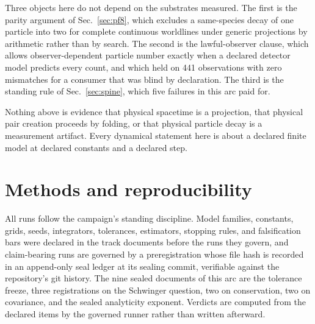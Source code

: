 \documentclass[aps,pre,reprint,nofootinbib,floatfix]{revtex4-2}
\begin{document}
Three objects here do not depend on the substrates measured.  The first
is the parity argument of Sec.~\ref{sec:pf8}, which excludes a
same-species decay of one particle into two for complete continuous
worldlines under generic projections by arithmetic rather than by
search.  The second is the lawful-observer clause, which allows
observer-dependent particle number exactly when a declared detector
model predicts every count, and which held on 441 observations with
zero mismatches for a consumer that was blind by declaration.  The
third is the standing rule of Sec.~\ref{sec:spine}, which five failures
in this arc paid for.

Nothing above is evidence that physical spacetime is a projection, that
physical pair creation proceeds by folding, or that physical particle
decay is a measurement artifact.  Every dynamical statement here is
about a declared finite model at declared constants and a declared
step.

\section{Methods and reproducibility}
\label{sec:methods}

All runs follow the campaign's standing discipline.  Model families,
constants, grids, seeds, integrators, tolerances, estimators, stopping
rules, and falsification bars were declared in the track documents
before the runs they govern, and claim-bearing runs are governed by a
preregistration whose file hash is recorded in an append-only seal
ledger at its sealing commit, verifiable against the repository's git
history.  The nine sealed documents of this arc are the tolerance
freeze, three registrations on the Schwinger question, two on
conservation, two on covariance, and the sealed analyticity exponent.
Verdicts are computed from the declared items by the governed runner
rather than written afterward.
\end{document}

